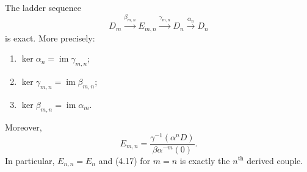 \begin{theorem}[Theorem 4.5]
The ladder sequence
\[
D_m \xrightarrow{\beta_{m,n}} E_{m,n} \xrightarrow{\gamma_{m,n}} D_n \xrightarrow{\alpha_n} D_n
\tag{4.17}
\]
is exact. More precisely:
\begin{enumerate}
\item[(i)] $\ker\alpha_n = \operatorname{im}\gamma_{m,n}$;
\item[(ii)] $\ker\gamma_{m,n} = \operatorname{im}\beta_{m,n}$;
\item[(iii)] $\ker\beta_{m,n} = \operatorname{im}\alpha_m$.
\end{enumerate}
Moreover,
\[
E_{m,n} = \frac{\gamma^{-1}(\alpha^n D)}{\beta\alpha^{-m}(0)}.
\tag{4.18}
\]
In particular, $E_{n,n} = E_n$ and (4.17) for $m=n$ is exactly the $n^{\text{th}}$ derived couple.
\end{theorem}
